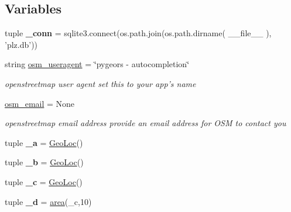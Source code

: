 \subsection*{Variables}
\begin{DoxyCompactItemize}
\item 
\hypertarget{namespacegeors_a8b633d071062d35496cc4c35670725de}{tuple {\bfseries \-\_\-conn} = sqlite3.\-connect(os.\-path.\-join(os.\-path.\-dirname( \-\_\-\-\_\-file\-\_\-\-\_\- ), 'plz.\-db'))}\label{namespacegeors_a8b633d071062d35496cc4c35670725de}

\item 
\hypertarget{namespacegeors_ac1a31bbbc06a9fd9bfdc8860c3a61e0c}{string \hyperlink{namespacegeors_ac1a31bbbc06a9fd9bfdc8860c3a61e0c}{osm\-\_\-useragent} = \char`\"{}pygeors -\/ autocompletion\char`\"{}}\label{namespacegeors_ac1a31bbbc06a9fd9bfdc8860c3a61e0c}

\begin{DoxyCompactList}\small\item\em openstreetmap user agent set this to your app's name \end{DoxyCompactList}\item 
\hypertarget{namespacegeors_a61e250eb73c709b7c855e9e96b0a3fcd}{\hyperlink{namespacegeors_a61e250eb73c709b7c855e9e96b0a3fcd}{osm\-\_\-email} = None}\label{namespacegeors_a61e250eb73c709b7c855e9e96b0a3fcd}

\begin{DoxyCompactList}\small\item\em openstreetmap email address provide an email address for O\-S\-M to contact you \end{DoxyCompactList}\item 
\hypertarget{namespacegeors_a2ab76ea44ea2c03066064d65ea4fb76e}{tuple {\bfseries \-\_\-a} = \hyperlink{classgeors_1_1GeoLoc}{Geo\-Loc}()}\label{namespacegeors_a2ab76ea44ea2c03066064d65ea4fb76e}

\item 
\hypertarget{namespacegeors_a9e2bf8a114400d8ee4b119082f45aebf}{tuple {\bfseries \-\_\-b} = \hyperlink{classgeors_1_1GeoLoc}{Geo\-Loc}()}\label{namespacegeors_a9e2bf8a114400d8ee4b119082f45aebf}

\item 
\hypertarget{namespacegeors_a3a65fd9ccc9e58725c7b9ffbb40081b2}{tuple {\bfseries \-\_\-c} = \hyperlink{classgeors_1_1GeoLoc}{Geo\-Loc}()}\label{namespacegeors_a3a65fd9ccc9e58725c7b9ffbb40081b2}

\item 
\hypertarget{namespacegeors_ab886686d60b4ac319f24920edbdb2599}{tuple {\bfseries \-\_\-d} = \hyperlink{namespacegeors_abf605583f4b44d3ade8ac9a0a9da63d1}{area}(\-\_\-c,10)}\label{namespacegeors_ab886686d60b4ac319f24920edbdb2599}


\end{DoxyCompactItemize}
